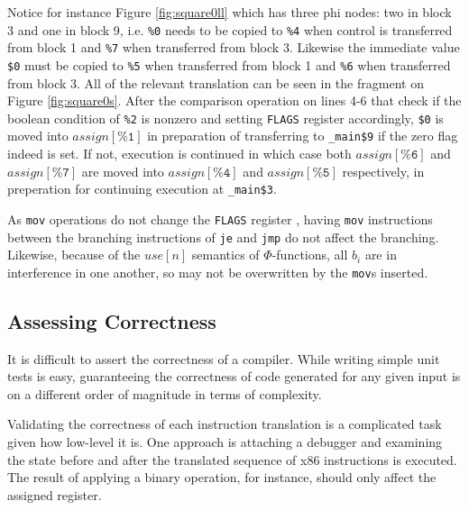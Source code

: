 \documentclass{article}
\begin{document}
\noindent Notice for instance Figure \ref{fig:square0ll} which has three phi nodes: two in  block 3 and one in block 9, i.e. \texttt{\%0} needs to be copied to \texttt{\%4} when control is transferred from block 1 and \texttt{\%7} when transferred from block 3. Likewise the immediate value \texttt{\$0} must be copied to \texttt{\%5} when transferred from block 1 and \texttt{\%6} when transferred from block 3.
All of the relevant translation can be seen in the fragment on Figure \ref{fig:square0s}. After the comparison operation on lines 4-6 that check if the boolean condition of \texttt{\%2} is nonzero and setting \texttt{FLAGS} register accordingly, \texttt{\$0} is moved into
\(\mathit{assign}[\texttt{\%1}]\) in preparation
of transferring to \texttt{\_main\$9} if the zero flag indeed is set. If not, execution is continued in which case both \(\mathit{assign}[\texttt{\%6}]\) and \(\mathit{assign}[\texttt{\%7}]\) are moved into \(\mathit{assign}[\texttt{\%4}]\) and \(\mathit{assign}[\texttt{\%5}]\) respectively, in preperation for continuing execution at \texttt{\_main\$3}.

As \texttt{mov} operations do not change the \texttt{FLAGS} register \cite{x86asm}, having \texttt{mov} instructions between the branching instructions of \texttt{je} and \texttt{jmp} do not affect the branching. Likewise, because of the \(\mathit{use}[n]\) semantics of \(\Phi\)-functions, all \(b_i\) are in interference in one another, so may not be overwritten by the \texttt{mov}s inserted.




%

\subsection{Assessing Correctness}
It is difficult to assert the correctness of a compiler. While writing simple unit tests is easy, guaranteeing the correctness of code generated for any given input is on a different order of magnitude in terms of complexity.

Validating the correctness of each instruction translation is a complicated task given how low-level it is. One approach is attaching a debugger and examining the state before and after the translated sequence of x86 instructions is executed. The result of applying a binary operation,  for instance, should only affect the assigned register.
\end{document}
